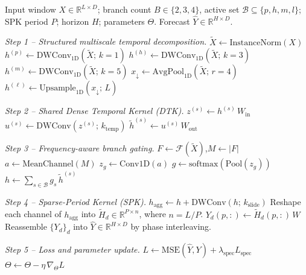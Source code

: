 \documentclass[journal]{IEEEtran}
\theoremstyle{remark}
\begin{document}
\begin{algorithm}[t]
\caption{FEATHer training step.}
\label{alg:feather}
\begin{algorithmic}[1]
\Require Input window $X \in \mathbb{R}^{L \times D}$;
         branch count $B \in \{2,3,4\}$, active set
         $\mathcal{B} \subseteq \{p,h,m,l\}$;
         SPK period $P$; horizon $H$; parameters $\Theta$.
\Ensure  Forecast $\widehat{Y} \in \mathbb{R}^{H \times D}$.

\Statex \emph{Step 1 -- Structured multiscale temporal decomposition.}
\State $\widetilde{X} \leftarrow \mathrm{InstanceNorm}(X)$
\State $h^{(p)} \leftarrow \mathrm{DWConv}_{1\mathrm{D}}(\widetilde{X};\, k{=}1)$
    \State $h^{(h)} \leftarrow \mathrm{DWConv}_{1\mathrm{D}}(\widetilde{X};\, k{=}3)$
\EndIf
{}
    \State $h^{(m)} \leftarrow \mathrm{DWConv}_{1\mathrm{D}}(\widetilde{X};\, k{=}5)$
\EndIf
\State $x_{\downarrow} \leftarrow \mathrm{AvgPool}_{1\mathrm{D}}(\widetilde{X};\, r{=}4)$
\State $h^{(\ell)} \leftarrow \mathrm{Upsample}_{1\mathrm{D}}(x_{\downarrow};\, L)$

\Statex \emph{Step 2 -- Shared Dense Temporal Kernel (DTK).}
    \State $z^{(s)} \leftarrow h^{(s)}\, W_{\mathrm{in}}$
    \State $u^{(s)} \leftarrow \mathrm{DWConv}(z^{(s)};\, k_{\mathrm{temp}})$
    \State $\widetilde{h}^{(s)} \leftarrow u^{(s)}\, W_{\mathrm{out}}$
\EndFor

\Statex \emph{Step 3 -- Frequency-aware branch gating.}
\State $F \leftarrow \mathcal{F}(\widetilde{X})$,\quad $M \leftarrow |F|$
\State $a \leftarrow \mathrm{MeanChannel}(M)$
\State $z_g \leftarrow \mathrm{Conv1D}(a)$
\State $g \leftarrow \mathrm{softmax}(\mathrm{Pool}(z_g))$
\State $h \leftarrow \sum_{s \in \mathcal{B}} g_s \, \widetilde{h}^{(s)}$

\Statex \emph{Step 4 -- Sparse-Period Kernel (SPK).}
\State $h_{\mathrm{agg}} \leftarrow h + \mathrm{DWConv}(h;\, k_{\mathrm{slide}})$
\State Reshape each channel of $h_{\mathrm{agg}}$ into $\widetilde{H}_d \in \mathbb{R}^{P \times n}$,
       where $n = L/P$.
    \State $Y_d(p, :) \leftarrow \widetilde{H}_d(p, :)\, W$
\EndFor
\State Reassemble $\{Y_d\}_d$ into $\widehat{Y} \in \mathbb{R}^{H \times D}$
       by phase interleaving.

\Statex \emph{Step 5 -- Loss and parameter update.}
\State $L \leftarrow \mathrm{MSE}(\widehat{Y}, Y) + \lambda_{\mathrm{spec}} L_{\mathrm{spec}}$
\State $\Theta \leftarrow \Theta - \eta\, \nabla_\Theta L$
\end{algorithmic}
\end{algorithm}
\end{document}
